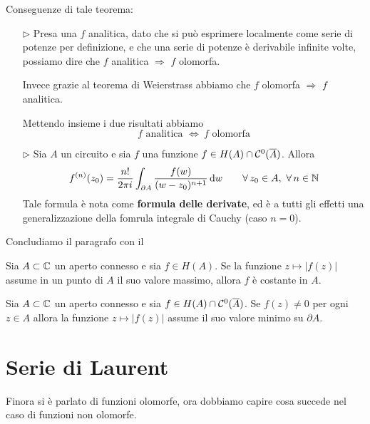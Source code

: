 Conseguenze di tale teorema:
\begin{enumerate}
    \item [$\triangleright$] Presa una $f$ analitica, dato che si può esprimere localmente come serie di potenze per definizione, e che una serie di potenze è derivabile infinite volte, possiamo dire che $f$ analitica $\Rightarrow$ $f$ olomorfa.

    Invece grazie al teorema di Weierstrass abbiamo che $f$ olomorfa $\Rightarrow$ $f$ analitica.

    Mettendo insieme i due risultati abbiamo
    $$
    \boxed{f\text{ analitica }\Leftrightarrow\ f\text{ olomorfa}}
    $$

    \item [$\triangleright$] Sia $A$ un circuito e sia $f$ una funzione $f\in H(A)\cap\mathcal{C}^0(\overline{A})$. Allora
    \begin{equation*}
    f^{(n)}(z_{0}) = \frac{n!}{2\pi i}\int_{\partial A}\frac{f(w)}{(w - z_{0})^{n + 1}} \dw \qquad \forall z_0\in A,\ \forall n\in \NN
    \end{equation*}
    Tale formula è nota come \textbf{formula delle derivate}, ed è a tutti gli effetti una generalizzazione della fomrula integrale di Cauchy (caso $n=0$).
\end{enumerate}

Concludiamo il paragrafo con il
\begin{thm}
Sia $A\subset\mathbb{C}$ un aperto connesso e sia $f\in H(A)$. Se la funzione $z\mapsto |f(z)|$ assume in un punto di $A$ il suo valore massimo, allora $f$ è costante in $A$.
\end{thm}

\begin{coro}
Sia $A\subset\mathbb{C}$ un aperto connesso e sia $f\in H(A)\cap\mathcal{C}^0(\overline{A})$. Se $f(z)\neq 0$ per ogni $z\in A$ allora la funzione $z\mapsto |f(z)|$ assume il suo valore minimo su $\partial A$.
\end{coro}

\newpage

\section{Serie di Laurent}

Finora si è parlato di funzioni olomorfe, ora dobbiamo capire cosa succede nel caso di funzioni non olomorfe.

